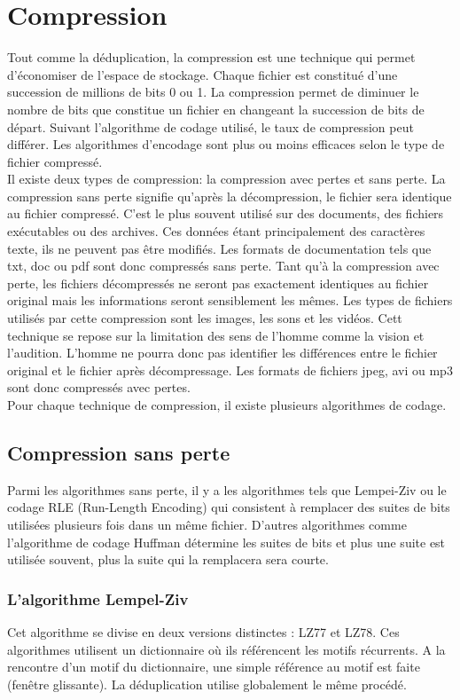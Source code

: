 \documentclass[a4paper]{report}
\begin{document}
	\chapter{Compression}
	Tout comme la déduplication, la compression est une technique qui permet d'économiser de l'espace de stockage. Chaque fichier est constitué d'une succession de millions de bits 0 ou 1. La compression permet de diminuer le nombre de bits que constitue un fichier en changeant la succession de bits de départ. Suivant l'algorithme de codage utilisé, le taux de compression peut différer. Les algorithmes d'encodage sont plus ou moins efficaces selon le type de fichier compressé.\\
 Il existe deux types de compression: la compression avec pertes et sans perte. La compression sans perte signifie qu'après la décompression, le fichier sera identique au fichier compressé. C'est le plus souvent utilisé sur des documents, des fichiers exécutables ou des archives. Ces données étant principalement des caractères texte, ils ne peuvent pas être modifiés. Les formats de documentation tels que txt, doc ou pdf sont donc compressés sans perte.  Tant qu'à la compression avec perte, les fichiers décompressés ne seront pas exactement identiques au fichier original mais les informations seront sensiblement les mêmes. Les types de fichiers utilisés par cette compression sont les images, les sons et les vidéos. Cett technique se repose sur la limitation des sens de l'homme comme la vision et l'audition. L'homme ne pourra donc pas identifier les différences entre le fichier original et le fichier après décompressage. Les formats de fichiers jpeg, avi ou mp3 sont donc compressés avec pertes. \\
Pour chaque technique de compression, il existe plusieurs algorithmes de codage.\\
	\section{Compression sans perte}
	Parmi les algorithmes sans perte, il y a les algorithmes tels que Lempei-Ziv ou le codage RLE (Run-Length Encoding) qui consistent à remplacer des suites de bits utilisées plusieurs fois dans un même fichier. D'autres algorithmes comme l'algorithme de codage Huffman détermine les suites de bits et plus une suite est utilisée souvent, plus la suite qui la remplacera sera courte.
	\subsection{L'algorithme Lempel-Ziv}
		Cet algorithme se divise en deux versions distinctes : LZ77 et LZ78. Ces algorithmes utilisent un dictionnaire où ils référencent les motifs récurrents. A la rencontre d'un motif du dictionnaire, une simple référence au motif est faite (fenêtre glissante). La déduplication utilise globalement le même procédé.\\
\end{document}
